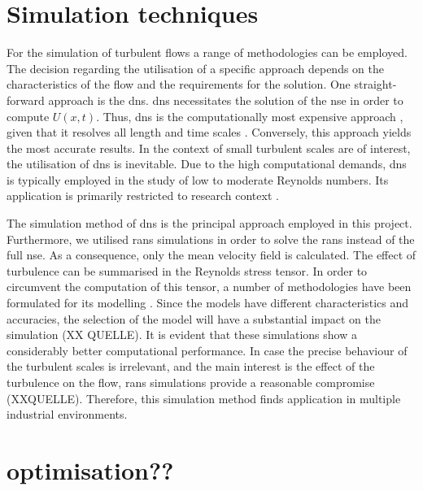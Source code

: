 \section{Simulation techniques} 
\label{sec:SimBasics}

For the simulation of turbulent flows a range of methodologies can be employed.
The decision regarding the utilisation of a specific approach  depends on the characteristics of the flow and the requirements for the solution.
One straight-forward approach is the \acrfull{dns}.
\acrfull{dns}  necessitates the solution of the \acrshort{nse} in order to compute  $U(x,t)$.
Thus, \acrshort{dns} is the computationally most expensive approach , given that it resolves all length and time scales \citep{pope_turbulent_2015}.  Conversely, this approach yields  the most accurate results.
In the context of  small turbulent scales are of interest, the  utilisation  of \acrshort{dns} is inevitable.
Due to the high computational demands, \acrshort{dns}  is typically employed in the study of   low to moderate Reynolds numbers. Its application is primarily restricted to research context .

The simulation method of \acrshort{dns} is the principal approach employed in  this project.
Furthermore, we  utilised \acrfull{rans} simulations in order to solve the \acrshort{rans} instead of the full \acrshort{nse}.
As a consequence, only the mean velocity field is calculated.
The effect of turbulence can be summarised in the Reynolds stress tensor.
In order to circumvent the computation of this tensor, a number of methodologies have been formulated for its modelling . 
Since the models have different characteristics and accuracies, the selection of the model will have a substantial  impact on the simulation (XX QUELLE).
It is evident that these simulations show a considerably better computational performance.
In case the precise behaviour of the turbulent scales is irrelevant, and the main interest  is the effect of the turbulence on the flow, \acrshort{rans} simulations provide a reasonable compromise (XXQUELLE).
Therefore, this simulation method finds application in multiple industrial environments.


\section{optimisation??}

